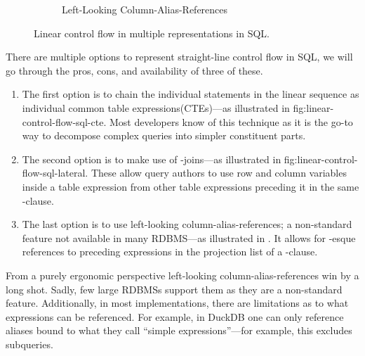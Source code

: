 \documentclass[sigconf,nonacm,screen,review,balance=false]{acmart}
\begin{document}
\begin{figure}[t]
\begin{subfigure}{0.4\textwidth}
    \caption{ Left-Looking Column-Alias-References}
    \label{fig:linear-control-flow-sql-select}
  \end{subfigure}
  \caption{{\color{linear}Linear} control flow in multiple representations in SQL.}
  \label{fig:linear-control-flow-sql}
\end{figure}

There are multiple options to represent straight-line control flow in SQL, we
will go through the pros, cons, and availability of three of these.

\begin{enumerate}
  \item[\cfoption{linear}{1}] The first option is to chain the
   individual statements in the linear sequence as individual common table
   expressions(CTEs)---as illustrated in \Cref
   {fig:linear-control-flow-sql-cte}. Most developers know of this technique as
   it is the go-to way to decompose complex queries into simpler constituent
   parts.

  \item[\cfoption{linear}{2}] The second option is to make use
   of -joins---as illustrated in \Cref
   {fig:linear-control-flow-sql-lateral}. These allow query authors to use row
   and column variables inside a table expression from other table expressions
   preceding it in the same -clause.

  \item[\cfoption{linear}{3}]The last option is to use left-looking
   column-alias-references; a non-standard feature not available in many
   RDBMS---as illustrated in . It
   allows for -esque references to preceding expressions in
   the projection list of a -clause.
\end{enumerate}

From a purely ergonomic perspective  left-looking
column-alias-references win by a long shot. Sadly, few large RDBMSs support
them as they are a non-standard feature. Additionally, in most implementations,
there are limitations as to what expressions can be referenced. For example, in
DuckDB \cite{duckdb} one can only reference aliases bound to what they call
``simple expressions''---for example, this excludes subqueries.
\end{document}
